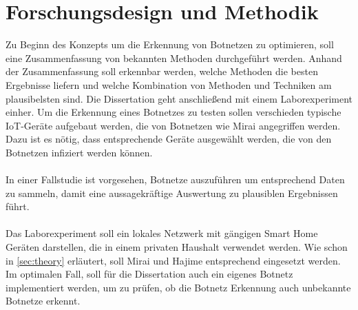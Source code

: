 \section{Forschungsdesign und Methodik}
\label{sec:methods}

Zu Beginn des Konzepts um die Erkennung von Botnetzen zu optimieren, soll eine Zusammenfassung von bekannten Methoden 
durchgeführt werden. Anhand der Zusammenfassung soll erkennbar werden, welche Methoden die besten Ergebnisse liefern 
und welche Kombination von Methoden und Techniken am plausibelsten sind. Die Dissertation geht anschließend mit einem 
Laborexperiment einher. Um die Erkennung eines Botnetzes zu testen sollen verschieden typische IoT-Geräte aufgebaut werden, 
die von Botnetzen wie Mirai angegriffen werden. Dazu ist es nötig, dass entsprechende Geräte ausgewählt werden, die von den 
Botnetzen infiziert werden können. \\ \\ In einer Fallstudie ist vorgesehen, Botnetze auszuführen um entsprechend Daten
zu sammeln, damit eine aussagekräftige Auswertung zu plausiblen Ergebnissen führt. \\ \\ Das Laborexperiment soll ein lokales 
Netzwerk mit gängigen Smart Home Geräten darstellen, die in einem privaten Haushalt verwendet werden. Wie schon in \ref{sec:theory}
erläutert, soll Mirai und Hajime entsprechend eingesetzt werden. Im optimalen Fall, soll für die Dissertation auch ein eigenes Botnetz
implementiert werden, um zu prüfen, ob die Botnetz Erkennung auch unbekannte Botnetze erkennt.
